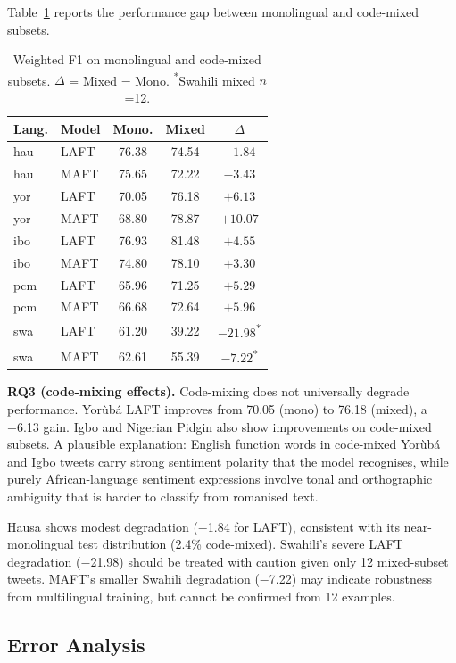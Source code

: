 \documentclass[11pt,twocolumn]{article}
\begin{document}
Table~\ref{tab:cmi_results} reports the performance gap between monolingual and code-mixed subsets.

\begin{table}[t]
\centering
\small
\setlength{\tabcolsep}{3pt}
\begin{tabular}{llccc}
\toprule
\textbf{Lang.} & \textbf{Model} & \textbf{Mono.} & \textbf{Mixed} & \textbf{$\Delta$} \\
\midrule
hau & LAFT & 76.38 & 74.54 & $-1.84$ \\
hau & MAFT & 75.65 & 72.22 & $-3.43$ \\
yor & LAFT & 70.05 & 76.18 & $+6.13$ \\
yor & MAFT & 68.80 & 78.87 & $+10.07$ \\
ibo & LAFT & 76.93 & 81.48 & $+4.55$ \\
ibo & MAFT & 74.80 & 78.10 & $+3.30$ \\
pcm & LAFT & 65.96 & 71.25 & $+5.29$ \\
pcm & MAFT & 66.68 & 72.64 & $+5.96$ \\
swa & LAFT & 61.20 & 39.22 & $-21.98$\textsuperscript{*} \\
swa & MAFT & 62.61 & 55.39 & $-7.22$\textsuperscript{*} \\
\bottomrule
\end{tabular}
\caption{Weighted F1 on monolingual and code-mixed subsets.
$\Delta$ = Mixed $-$ Mono. \textsuperscript{*}Swahili mixed $n$=12.}
\label{tab:cmi_results}
\end{table}

\textbf{RQ3 (code-mixing effects).} Code-mixing does not universally degrade performance.
Yor\`{u}b\'{a} LAFT improves from 70.05 (mono) to 76.18 (mixed), a +6.13 gain. Igbo and
Nigerian Pidgin also show improvements on code-mixed subsets. A plausible explanation: English
function words in code-mixed Yor\`{u}b\'{a} and Igbo tweets carry strong sentiment polarity
that the model recognises, while purely African-language sentiment expressions involve tonal
and orthographic ambiguity that is harder to classify from romanised text.

Hausa shows modest degradation ($-$1.84 for LAFT), consistent with its near-monolingual
test distribution (2.4\% code-mixed). Swahili's severe LAFT degradation ($-$21.98) should
be treated with caution given only 12 mixed-subset tweets. MAFT's smaller Swahili degradation
($-$7.22) may indicate robustness from multilingual training, but cannot be confirmed from
12 examples.

\subsection{Error Analysis}
\end{document}
